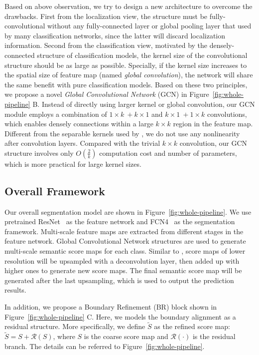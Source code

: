 \documentclass[10pt,twocolumn,letterpaper]{article}
\begin{document}
   Based on above observation, we try to design a new architecture to overcome the drawbacks. First from the localization view, the structure must be fully-convolutional without any fully-connected layer or global pooling layer that used by many classification networks, since the latter will discard localization information. Second from the classification view, motivated by the densely-connected structure of classification models, the kernel size of the convolutional structure should be as large as possible. Specially, if the kernel size increases to the spatial size of feature map (named \emph{global convolution}), the network will share the same benefit with pure classification models. Based on these two principles, we propose a novel \emph{Global Convolutional Network} (GCN) in Figure~\ref{fig:whole-pipeline} B. Instead of directly using larger kernel or global convolution, our GCN module employs a combination of $1\times k~+k\times 1$ and $k\times 1~+1\times k$ convolutions, which enables densely connections within a large $k\times k$ region in the feature map. Different from the separable kernels used by \cite{szegedy2015rethinking}, we do not use any nonlinearity after convolution layers. Compared with the trivial $k\times k$ convolution, our GCN structure involves only $O(\frac{2}{k})$ computation cost and number of parameters, which is more practical for large kernel sizes.
   
\subsection{Overall Framework}
\label{sec:network-design}
	Our overall segmentation model are shown in Figure~\ref{fig:whole-pipeline}. We use pretrained ResNet~\cite{He_2016_CVPR} as the feature network and FCN4~\cite{long2015fully,xie2015holistically} as the segmentation framework. Multi-scale feature maps are extracted from different stages in the feature network. Global Convolutional Network structures are used to generate multi-scale semantic score maps for each class. Similar to \cite{long2015fully,xie2015holistically}, score maps of lower resolution will be upsampled with a deconvolution layer, then added up with higher ones to generate new score maps. The final semantic score map will be generated after the last upsampling, which is used to output the prediction results.
\par
   In addition, we propose a Boundary Refinement (BR) block shown in Figure~\ref{fig:whole-pipeline} C. Here, we models the boundary alignment as a residual structure. More specifically, we define $\tilde S$ as the refined score map: $\tilde S = S + \mathcal{R}(S)$, where $S$ is the coarse score map and $\mathcal{R}(\cdot)$ is the residual branch. The details can be referred to Figure~\ref{fig:whole-pipeline}. 
\end{document}
